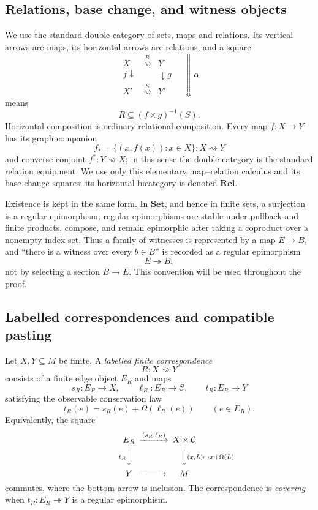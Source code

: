 \subsection{Relations, base change, and witness objects}

We use the standard double category of sets, maps and relations.  Its vertical arrows are maps, its horizontal arrows are relations, and a square
\[
\begin{array}{ccc}
X & \overset{R}{\rightsquigarrow} & Y\\[-1mm]
{\scriptstyle f}\downarrow && \downarrow{\scriptstyle g}\\[-1mm]
X' & \overset{S}{\rightsquigarrow} & Y'
\end{array}
\quad\Downarrow\alpha
\]
means
\[
R\subseteq(f\times g)^{-1}(S).
\]
Horizontal composition is ordinary relational composition.  Every map $f:X\to Y$ has its graph companion
\[
f_* = \{(x,f(x)):x\in X\}:X\rightsquigarrow Y
\]
and converse conjoint $f^*:Y\rightsquigarrow X$; in this sense the double category is the standard relation equipment.  We use only this elementary map--relation calculus and its base-change squares; its horizontal bicategory is denoted $\mathbf{Rel}$.

Existence is kept in the same form.  In $\mathbf{Set}$, and hence in finite sets, a surjection is a regular epimorphism; regular epimorphisms are stable under pullback and finite products, compose, and remain epimorphic after taking a coproduct over a nonempty index set.  Thus a family of witnesses is represented by a map $E\to B$, and ``there is a witness over every $b\in B$'' is recorded as a regular epimorphism
\[
E\twoheadrightarrow B,
\]
not by selecting a section $B\to E$.  This convention will be used throughout the proof.

\subsection{Labelled correspondences and compatible pasting}

Let $X,Y\subseteq M$ be finite.  A \emph{labelled finite correspondence}
\[
R:X\rightsquigarrow Y
\]
consists of a finite edge object $E_R$ and maps
\[
s_R:E_R\to X,
\qquad
\ell_R:E_R\to\mathcal C,
\qquad
t_R:E_R\to Y
\]
satisfying the observable conservation law
\begin{equation}\label{eq:edge-conservation}
t_R(e)=s_R(e)+\Omega(\ell_R(e))
\qquad(e\in E_R).
\end{equation}
Equivalently, the square
\begin{equation}\label{eq:edge-conservation-square}
\begin{CD}
E_R @>{(s_R,\ell_R)}>> X\times\mathcal C\\
@V{t_R}VV @VV{(x,L)\mapsto x+\Omega(L)}V\\
Y @>>> M
\end{CD}
\end{equation}
commutes, where the bottom arrow is inclusion.  The correspondence is \emph{covering} when $t_R:E_R\twoheadrightarrow Y$ is a regular epimorphism.

